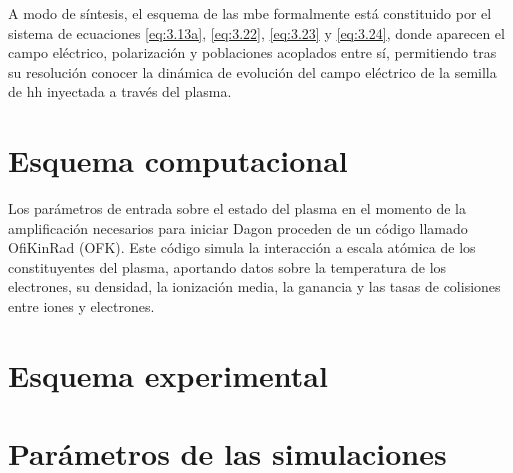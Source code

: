 A modo de síntesis, el esquema de las \acrshort{mbe} formalmente está constituido por el sistema de ecuaciones \eqref{eq:3.13a}, \eqref{eq:3.22}, \eqref{eq:3.23} y \eqref{eq:3.24}, donde aparecen el campo eléctrico, polarización y poblaciones acoplados entre sí, permitiendo tras su resolución conocer la dinámica de evolución del campo eléctrico de la semilla de \acrshort{hh} inyectada a través del plasma.

\section{Esquema computacional}\label{sec:3.2}
Los parámetros de entrada sobre el estado del plasma en el momento de la amplificación necesarios para iniciar Dagon proceden de un código llamado OfiKinRad (OFK). Este código simula la interacción a escala atómica de los constituyentes del plasma, aportando datos sobre la temperatura de los electrones, su densidad, la ionización media, la ganancia y las tasas de colisiones entre iones y electrones.

\section{Esquema experimental}\label{sec:3.3}

\section{Parámetros de las simulaciones}\label{sec:3.4}
